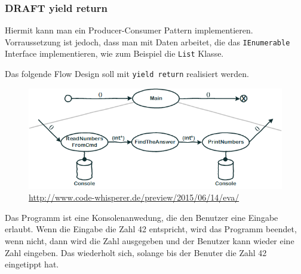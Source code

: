 \documentclass[11pt]{article}
\begin{document}
\subsubsection{{\bfseries\sffamily DRAFT} yield return}
\label{sec:orgheadline46}
Hiermit kann man ein Producer-Consumer Pattern implementieren.
Vorraussetzung ist jedoch, dass man mit Daten arbeitet, die das \texttt{IEnumerable} Interface implementieren, wie zum Beispiel die
\texttt{List} Klasse.

Das folgende Flow Design soll mit \texttt{yield return} realisiert werden.

\begin{figure}[htb]
\centering
\includegraphics[width=.9\linewidth]{./img/FlowDesign2.png}
\caption{\url{http://www.code-whisperer.de/preview/2015/06/14/eva/}}
\end{figure}


Das Programm ist eine Konsolenanwedung, die den Benutzer eine Eingabe erlaubt.
Wenn die Eingabe die Zahl 42 entspricht, wird das Programm beendet, wenn nicht,
dann wird die Zahl ausgegeben und der Benutzer kann wieder eine Zahl eingeben.
Das wiederholt sich, solange bis der Benuter die Zahl 42 eingetippt hat.
\end{document}
